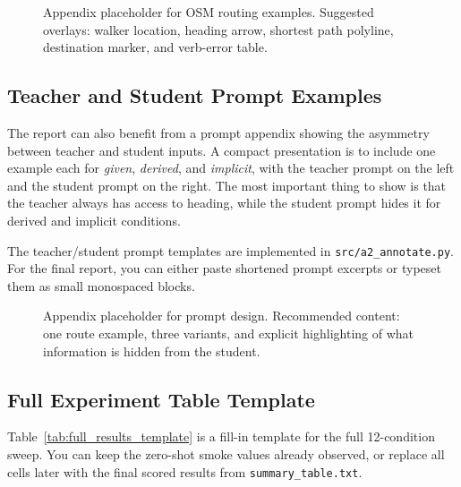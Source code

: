\documentclass[10pt,twocolumn,letterpaper]{article}
\begin{document}
\begin{figure}[t]
\centering
{}
\caption{Appendix placeholder for OSM routing examples. Suggested overlays: walker location, heading arrow, shortest path polyline, destination marker, and verb-error table.}
\label{fig:appendix_route}
\end{figure}

\subsection{Teacher and Student Prompt Examples}
The report can also benefit from a prompt appendix showing the asymmetry between teacher and student inputs. A compact presentation is to include one example each for \textit{given}, \textit{derived}, and \textit{implicit}, with the teacher prompt on the left and the student prompt on the right. The most important thing to show is that the teacher always has access to heading, while the student prompt hides it for derived and implicit conditions.

The teacher/student prompt templates are implemented in \texttt{src/a2\_annotate.py}. For the final report, you can either paste shortened prompt excerpts or typeset them as small monospaced blocks.

\begin{figure}[t]
\centering
{}
\caption{Appendix placeholder for prompt design. Recommended content: one route example, three variants, and explicit highlighting of what information is hidden from the student.}
\label{fig:appendix_prompts}
\end{figure}

\subsection{Full Experiment Table Template}
Table~\ref{tab:full_results_template} is a fill-in template for the full 12-condition sweep. You can keep the zero-shot smoke values already observed, or replace all cells later with the final scored results from \texttt{summary\_table.txt}.
\end{document}
